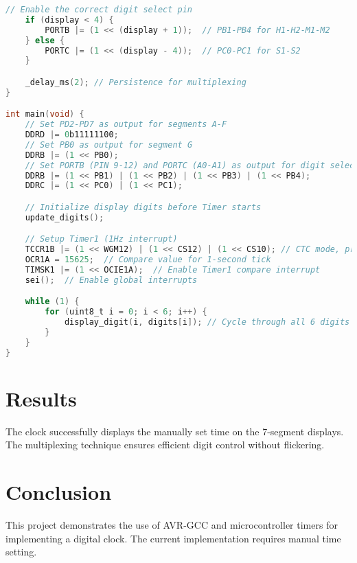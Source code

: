 \documentclass[a4paper,12pt]{article}
\begin{document}
\begin{lstlisting}[language=C, basicstyle=\ttfamily, keywordstyle=\color{blue}, commentstyle=\color{green}]
    // Enable the correct digit select pin
    if (display < 4) {
        PORTB |= (1 << (display + 1));  // PB1-PB4 for H1-H2-M1-M2
    } else {
        PORTC |= (1 << (display - 4));  // PC0-PC1 for S1-S2
    }

    _delay_ms(2); // Persistence for multiplexing
}

int main(void) {
    // Set PD2-PD7 as output for segments A-F
    DDRD |= 0b11111100;
    // Set PB0 as output for segment G
    DDRB |= (1 << PB0);
    // Set PORTB (PIN 9-12) and PORTC (A0-A1) as output for digit selection
    DDRB |= (1 << PB1) | (1 << PB2) | (1 << PB3) | (1 << PB4);
    DDRC |= (1 << PC0) | (1 << PC1);

    // Initialize display digits before Timer starts
    update_digits();

    // Setup Timer1 (1Hz interrupt)
    TCCR1B |= (1 << WGM12) | (1 << CS12) | (1 << CS10); // CTC mode, prescaler 1024
    OCR1A = 15625;  // Compare value for 1-second tick
    TIMSK1 |= (1 << OCIE1A);  // Enable Timer1 compare interrupt
    sei();  // Enable global interrupts

    while (1) {
        for (uint8_t i = 0; i < 6; i++) {
            display_digit(i, digits[i]); // Cycle through all 6 digits
        }
    }
}
\end{lstlisting}
\section{Results}
The clock successfully displays the manually set time on the 7-segment displays. The multiplexing technique ensures efficient digit control without flickering.

\section{Conclusion}
This project demonstrates the use of AVR-GCC and microcontroller timers for implementing a digital clock. The current implementation requires manual time setting.
\end{document}
